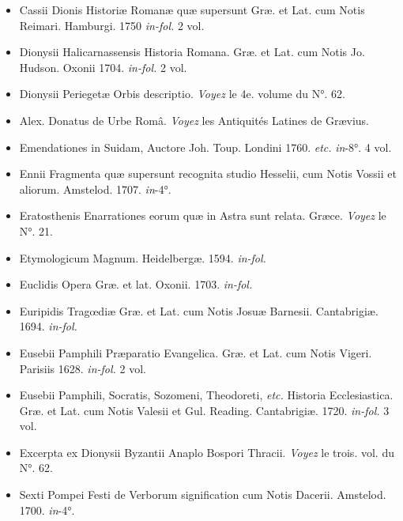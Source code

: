 \documentclass[a4paper, 18pt, oneside]{article}
\begin{document}
\begin{itemize}
    \item Cassii Dionis Historiæ Romanæ quæ supersunt Græ. et Lat. cum Notis Reimari. Hamburgi. 1750 \emph{in-fol.} 2 vol.

    \item Dionysii Halicarnassensis Historia Romana. Græ. et Lat. cum Notis Jo. Hudson. Oxonii 1704. \emph{in-fol.} 2 vol.

    \item Dionysii Periegetæ Orbis descriptio. \emph{Voyez} le 4e. volume du N°. 62.

    \item Alex. Donatus de Urbe Româ. \emph{Voyez} les Antiquités Latines de Grævius.

    \item Emendationes in Suidam, Auctore Joh. Toup. Londini 1760. \emph{etc.} \emph{in}-8°. 4 vol.

    \item Ennii Fragmenta quæ supersunt recognita studio Hesselii, cum Notis Vossii et aliorum. Amstelod. 1707. \emph{in}-4°.

    \item Eratosthenis Enarrationes eorum quæ in Astra sunt relata. Græce. \emph{Voyez} le N°. 21.

    \item Etymologicum Magnum. Heidelbergæ. 1594. \emph{in-fol.}

    \item Euclidis Opera Græ. et lat. Oxonii. 1703. \emph{in-fol.}

    \item Euripidis Tragœdiæ Græ. et Lat. cum Notis Josuæ Barnesii. Cantabrigiæ. 1694. \emph{in-fol.}

    \item Eusebii Pamphili Præparatio Evangelica. Græ. et Lat. cum Notis Vigeri. Parisiis 1628. \emph{in-fol.} 2 vol.

    \item Eusebii Pamphili, Socratis, Sozomeni, Theodoreti, \emph{etc.} Historia Ecclesiastica. Græ. et Lat. cum Notis Valesii et Gul. Reading. Cantabrigiæ. 1720. \emph{in-fol.} 3 vol.

    \item Excerpta ex Dionysii Byzantii Anaplo Bospori Thracii. \emph{Voyez} le trois. vol. du N°. 62.

    \item Sexti Pompei Festi de Verborum signification cum Notis Dacerii. Amstelod. 1700. \emph{in}-4°.


\end{itemize}
\end{document}
